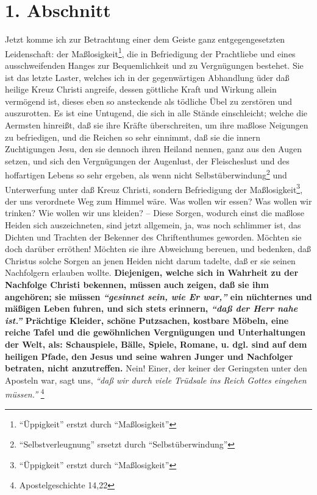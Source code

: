 \section{1. Abschnitt} \label{kap14_ab1}

Jetzt komme ich zur Betrachtung einer dem Geiste ganz entgegengesetzten
Leidenschaft: der Maßlosigkeit\footnote{"`Üppigkeit"' erstzt durch "`Maßlosigkeit"'}, die in Befriedigung der Prachtliebe und eines
ausschweifenden Hanges zur Bequemlichkeit und zu Vergnügungen bestehet. Sie ist
das letzte Laster, welches ich in der gegenwärtigen Abhandlung üder daß heilige
Kreuz Christi angreife, dessen göttliche Kraft und Wirkung allein vermögend ist,
dieses eben so ansteckende als tödliche Übel zu zerstören und auszurotten. Es
ist eine Untugend, die sich in alle Stände einschleicht; welche die Aermsten
hinreißt, daß sie ihre Kräfte überschreiten, um ihre maßlose Neigungen zu
befriedigen, und die Reichen so sehr einnimmt, daß sie die innern Zuchtigungen
Jesu, den sie dennoch ihren Heiland nennen, ganz aus den Augen setzen, und sich
den Vergnügungen der Augenlust, der Fleischeslust und des hoffartigen Lebens so
sehr ergeben, als wenn nicht Selbstüberwindung\footnote{"`Selbstverleugnung"' srsetzt durch "`Selbstüberwindung"'} und Unterwerfung unter daß Kreuz
Christi, sondern Befriedigung der Maßlosigkeit\footnote{"`Üppigkeit"' erstzt durch "`Maßlosigkeit"'}, der uns verordnete Weg zum Himmel
wäre. Was wollen wir essen? Was wollen wir trinken? Wie wollen wir uns kleiden?
-- Diese Sorgen, wodurch einst die maßlose Heiden sich auszeichneten, sind jetzt
allgemein, ja, was noch schlimmer ist, das Dichten und Trachten der Bekenner des
Chriftenthumes geworden. Möchten sie doch darüber erröthen! Möchten sie ihre
Abweichung bereuen, und bedenken, daß Christus solche Sorgen an jenen Heiden
nicht darum tadelte, daß er sie seinen Nachfolgern erlauben wollte. \textbf{Diejenigen,
welche sich in Wahrheit zu der Nachfolge Christi bekennen, müssen auch zeigen,
daß sie ihm angehören; sie müssen
\textit{"`gesinnet sein, wie Er war,"'} ein nüchternes
und mäßigen Leben fuhren, und sich stets erinnern,
\textit{"`daß der Herr nahe ist."'}
Prächtige Kleider, schöne Putzsachen, kostbare Möbeln, eine reiche Tafel und die
gewöhnlichen Vergnügungen und Unterhaltungen der Welt, als: Schauspiele, Bälle,
Spiele, Romane, u. dgl. sind auf dem heiligen Pfade, den Jesus und seine wahren
Junger und Nachfolger betraten, nicht anzutreffen.} Nein! Einer, der keiner der
Geringsten unter den Aposteln war, sagt uns,
\textit{"`daß wir durch viele Trüdsale ins
Reich Gottes eingehen müssen."'}
\footnote{Apostelgeschichte 14,22}

